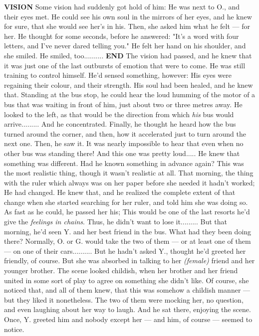 \textbf{VISION}
Some vision had suddenly got hold of him: He was next to O., and their eyes met. He could see his own soul in the mirrors of her eyes, and he knew for sure, that she would see her's in his. 
Then, she asked him what he felt --- for her. 
He thought for some seconds, before he answered: "It's a word with four letters, and I've never dared telling you."
He felt her hand on his shoulder, and she smiled. 
He smiled, too..........
\textbf{END}
The vision had passed, and he knew that it was just one of the last outbursts of emotion that were to come. He was still training to control himself. 
He'd sensed something, however: His eyes were regaining their colour, and their strength. His soul had been healed, and he knew that. 
Standing at the bus stop, he could hear the loud humming of the motor of a bus that was waiting in front of him, just about two or three metres away. He looked to the left, as that would be the direction from which \emph{his} bus would arrive.........
And he concentrated. Finally, he thought he heard how the bus turned around the corner, and then, how it accelerated just to turn around the next one. 
Then, he saw it. 
It was nearly impossible to hear that even when no other bus was standing there! And this one was pretty loud.....
He knew that something was different. Had he known something in advance again? This was the most realistic thing, though it wasn't realistic at all. 
That morning, the thing with the ruler which always was on her paper before she needed it hadn't worked; He had changed. 
He knew that, and he realized the complete extent of that change when she started searching for her ruler, and told him she was doing so. As fast as he could, he passed her his; This would be one of the last resorts he'd give the \emph{feelings in chains}. Thus, he didn't want to lose it.........
But that morning, he'd seen Y. and her best friend in the bus. What had they been doing there? Normally, O. or G. would take the two of them --- or at least one of them --- on one of their cars..........
But he hadn't asked Y., thought he'd greeted her friendly, of course. But she was absorbed in talking to her \emph{(female)} friend and her younger brother. The scene looked childish, when her brother and her friend united in some sort of play to agree on something she didn't like. Of course, she noticed that, and all of them knew, that this was somehow a childish manner --- but they liked it nonetheless. 
The two of them were mocking her, no question, and even laughing about her way to laugh. 
And he sat there, enjoying the scene. 
Once, Y. greeted him and nobody except her --- and him, of course --- seemed to notice. 
